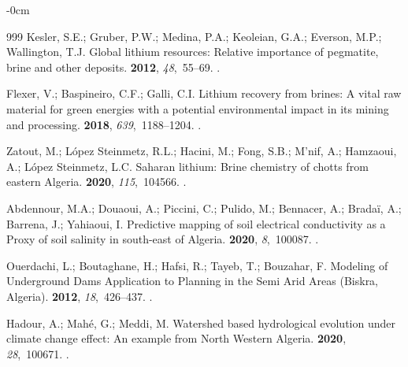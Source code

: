 \documentclass[asi,article,accept,pdftex,moreauthors]{Definitions/mdpi}
\begin{document}
\begin{adjustwidth}{-\extralength}{0cm}
\begin{thebibliography}{999}
Kesler, S.E.; Gruber, P.W.; Medina, P.A.; Keoleian, G.A.; Everson, M.P.;
  Wallington, T.J.
\newblock Global lithium resources: Relative importance of pegmatite, brine and
  other deposits.
 {\bf 2012}, {\em 48},~55--69.
\mbox{.}

Flexer, V.; Baspineiro, C.F.; Galli, C.I.
\newblock Lithium recovery from brines: A vital raw material for green energies
  with a potential environmental impact in its mining and processing.
 {\bf 2018}, {\em
  639},~1188--1204.
.

Zatout, M.; {López Steinmetz}, R.L.; Hacini, M.; Fong, S.B.; M'nif, A.;
  Hamzaoui, A.; {López Steinmetz}, L.C.
\newblock Saharan lithium: Brine chemistry of chotts from eastern Algeria.
 {\bf 2020}, {\em 115},~104566.
.

Abdennour, M.A.; Douaoui, A.; Piccini, C.; Pulido, M.; Bennacer, A.; Bradaï,
  A.; Barrena, J.; Yahiaoui, I.
\newblock Predictive mapping of soil electrical conductivity as a Proxy of soil
  salinity in south-east of Algeria.
 {\bf 2020}, {\em
  8},~100087.
.

Ouerdachi, L.; Boutaghane, H.; Hafsi, R.; Tayeb, T.; Bouzahar, F.
\newblock Modeling of Underground Dams Application to Planning in the Semi Arid
  Areas (Biskra, Algeria).
 {\bf 2012}, {\em 18},~426--437.
.

Hadour, A.; Mahé, G.; Meddi, M.
\newblock Watershed based hydrological evolution under climate change effect:
  An example from North Western Algeria.
 {\bf 2020}, {\em
  28},~100671.
.


\end{thebibliography}
\end{adjustwidth}
\end{document}
